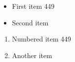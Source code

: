 \documentclass{article}
\begin{document}
\begin{itemize}
\item First item 449
\item Second item
\end{itemize}
\begin{enumerate}
\item Numbered item 449
\item Another item
\end{enumerate}
\end{document}
